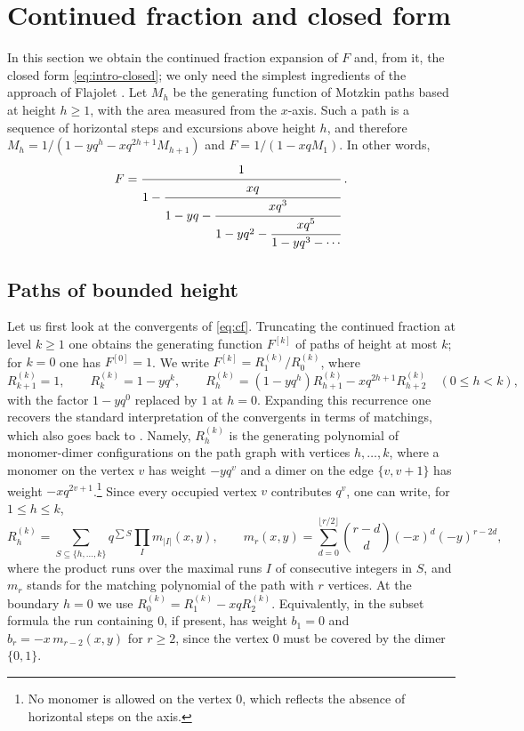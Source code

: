 \documentclass[11pt,reqno]{amsart}
\numberwithin{equation}{section}
\theoremstyle{remark}
\begin{document}
\section{Continued fraction and closed form}\label{sec:closed}

In this section we obtain the continued fraction expansion of $F$ and, from it, the
closed form \eqref{eq:intro-closed}; we only need the simplest ingredients of the approach
of Flajolet \cite{Flajolet80}. Let $M_h$ be
the generating function of Motzkin paths based at height $h\ge1$, with the area measured
from the $x$-axis. Such a path is a sequence of horizontal steps and excursions above
height $h$, and therefore
$M_h=1/(1-yq^h-xq^{2h+1}M_{h+1})$ and $F=1/(1-xqM_1)$. In other words,
\begin{equation}\label{eq:cf}
F=\cfrac{1}{1-\cfrac{xq}{1-yq-\cfrac{xq^3}{1-yq^2-\cfrac{xq^5}{1-yq^3-\cdots}}}}\;.
\end{equation}

\subsection{Paths of bounded height}
Let us first look at the convergents of \eqref{eq:cf}. Truncating the continued fraction
at level $k\ge1$ one obtains the generating function $F^{[k]}$ of paths of height at most
$k$; for $k=0$ one has $F^{[0]}=1$. We write $F^{[k]}=R^{(k)}_1/R^{(k)}_0$, where
\begin{equation}\label{eq:R}
R^{(k)}_{k+1}=1,\qquad R^{(k)}_k=1-yq^k,\qquad
R^{(k)}_h=(1-yq^h)R^{(k)}_{h+1}-xq^{2h+1}R^{(k)}_{h+2}\quad(0\le h<k),
\end{equation}
with the factor $1-yq^0$ replaced by $1$ at $h=0$. Expanding this recurrence one recovers
the standard interpretation of the convergents in terms of matchings, which also goes
back to \cite{Flajolet80}. Namely, $R^{(k)}_h$ is the generating polynomial of
monomer-dimer configurations on the path graph with vertices $h,\dots,k$, where a monomer
on the vertex $v$ has weight $-yq^v$ and a dimer on the edge $\{v,v+1\}$ has weight
$-xq^{2v+1}$.\footnote{No monomer is allowed on the vertex $0$, which reflects the absence
of horizontal steps on the axis.} Since every occupied vertex $v$ contributes $q^v$, one
can write, for $1\le h\le k$,
\begin{equation}\label{eq:match}
R^{(k)}_h=\sum_{S\subseteq\{h,\dots,k\}}q^{\sum S}\prod_{I}m_{|I|}(x,y),
\qquad m_r(x,y)=\sum_{d=0}^{\lfloor r/2\rfloor}\binom{r-d}{d}(-x)^d(-y)^{r-2d},
\end{equation}
where the product runs over the maximal runs $I$ of consecutive integers in $S$, and
$m_r$ stands for the matching polynomial of the path with $r$ vertices. At the boundary
$h=0$ we use $R^{(k)}_0=R^{(k)}_1-xqR^{(k)}_2$. Equivalently, in the subset formula the run
containing $0$, if present, has weight $b_1=0$ and $b_r=-x\,m_{r-2}(x,y)$ for $r\ge2$,
since the vertex $0$ must be covered by the dimer $\{0,1\}$.
\end{document}
